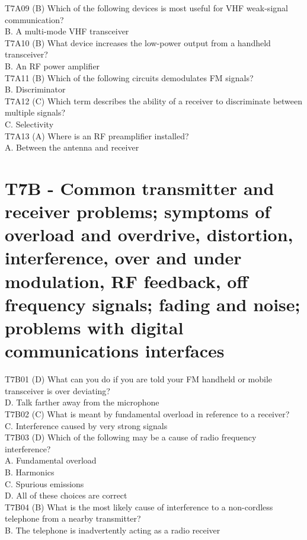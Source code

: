 \documentclass[12pt,letterpaper]{report}
\begin{document}
T7A09 (B) Which of the following devices is most useful for VHF weak-signal communication?\\
B. A multi-mode VHF transceiver\\

T7A10 (B) What device increases the low-power output from a handheld transceiver?\\
B. An RF power amplifier\\

T7A11 (B) Which of the following circuits demodulates FM signals?\\
B. Discriminator\\

T7A12 (C) Which term describes the ability of a receiver to discriminate between multiple signals?\\
C. Selectivity\\

T7A13 (A) Where is an RF preamplifier installed?\\
A. Between the antenna and receiver\\


\section{T7B - Common transmitter and receiver problems; symptoms of overload and overdrive, distortion, interference, over and under modulation, RF feedback, off frequency signals; fading and noise; problems with digital communications interfaces}

T7B01 (D) What can you do if you are told your FM handheld or mobile transceiver is over deviating?\\
D. Talk farther away from the microphone\\

T7B02 (C) What is meant by fundamental overload in reference to a receiver?\\
C. Interference caused by very strong signals\\

T7B03 (D) Which of the following may be a cause of radio frequency interference?\\
A. Fundamental overload\\
B. Harmonics\\
C. Spurious emissions\\
D. All of these choices are correct\\

T7B04 (B) What is the most likely cause of interference to a non-cordless telephone from a nearby transmitter?\\
B. The telephone is inadvertently acting as a radio receiver\\
\end{document}
